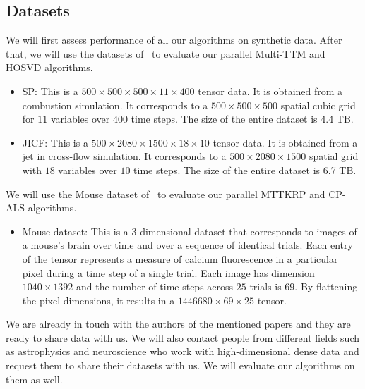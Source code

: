 \documentclass[a4paper,11pt]{article}
\begin{document}
	

	

	\subsection{Datasets}
	\label{sec:context:datasets}
	We will first assess performance of all our algorithms on synthetic data. After that, we will use the datasets of~\cite{BKK-TOMS-2020} to evaluate our parallel Multi-TTM and HOSVD algorithms.
	\begin{itemize}
		\item SP: This is a $500 \times 500 \times 500 \times 11 \times 400$ tensor data. It is obtained from a combustion simulation. It corresponds to a $500 \times 500 \times 500$ spatial cubic grid for $11$ variables over $400$ time steps. The size of the entire dataset is 4.4 TB. 
		\item JICF: This is a $500 \times 2080 \times 1500 \times 18 \times 10$ tensor data. It is obtained from a jet in cross-flow simulation. It corresponds to a $500 \times 2080 \times 1500$ spatial grid with $18$ variables over $10$ time steps. The size of the entire dataset is 6.7 TB.
	\end{itemize}
	
	We will use the Mouse dataset of~\cite{EHBKMP-TOMS-2021} to evaluate our parallel MTTKRP and CP-ALS algorithms.
	\begin{itemize}
		\item Mouse dataset: This is a 3-dimensional dataset that corresponds to images of a mouse's brain over time and over a sequence of identical trials. Each entry of the tensor represents a measure of calcium fluorescence in a particular pixel during a time step of a single trial. Each image has dimension $1040\times 1392$ and the number of time steps across $25$ trials is $69$. By flattening the pixel dimensions, it results in a $1446680 \times 69 \times 25$ tensor. 
	\end{itemize}
	We are already in touch with the authors of the mentioned papers and they are ready to share data with us.
	We will also contact people from different fields such as astrophysics and neuroscience who work with high-dimensional dense data and request them to share their datasets with us. We will evaluate our algorithms on them as well.
	
	
	\medskip
	
\end{document}

